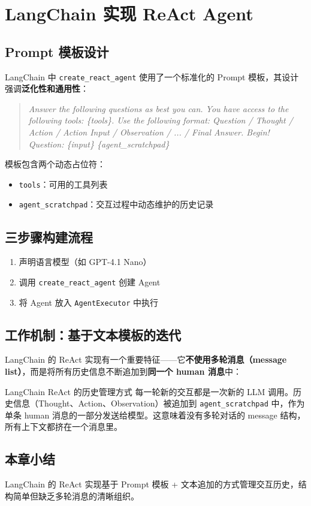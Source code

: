 \section{LangChain 实现 ReAct Agent}

\subsection{Prompt 模板设计}

LangChain 中 \texttt{create\_react\_agent} 使用了一个标准化的 Prompt 模板，其设计强调\textbf{泛化性和通用性}：

\begin{quote}
\textit{Answer the following questions as best you can. You have access to the following tools: \{tools\}. Use the following format: Question / Thought / Action / Action Input / Observation / ... / Final Answer. Begin! Question: \{input\} \{agent\_scratchpad\}}
\end{quote}

模板包含两个动态占位符：
\begin{itemize}
    \item \texttt{tools}：可用的工具列表
    \item \texttt{agent\_scratchpad}：交互过程中动态维护的历史记录
\end{itemize}

\subsection{三步骤构建流程}

\begin{enumerate}
    \item 声明语言模型（如 GPT-4.1 Nano）
    \item 调用 \texttt{create\_react\_agent} 创建 Agent
    \item 将 Agent 放入 \texttt{AgentExecutor} 中执行
\end{enumerate}

\subsection{工作机制：基于文本模板的迭代}

LangChain 的 ReAct 实现有一个重要特征——它\textbf{不使用多轮消息（message list）}，而是将所有历史信息不断追加到\textbf{同一个 human 消息}中：

\begin{warningbox}{LangChain ReAct 的历史管理方式}
每一轮新的交互都是一次新的 LLM 调用。历史信息（Thought、Action、Observation）被追加到 \texttt{agent\_scratchpad} 中，作为单条 human 消息的一部分发送给模型。这意味着没有多轮对话的 message 结构，所有上下文都挤在一个消息里。
\end{warningbox}

\subsection{本章小结}
LangChain 的 ReAct 实现基于 Prompt 模板 + 文本追加的方式管理交互历史，结构简单但缺乏多轮消息的清晰组织。

